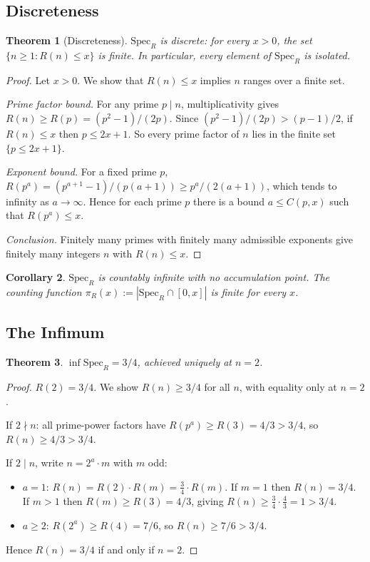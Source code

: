 \documentclass[12pt]{article}
\newtheorem{theorem}{Theorem}[section]
\newtheorem{corollary}[theorem]{Corollary}
\newcommand{\SpecR}{\mathrm{Spec}_R}
\begin{document}
\subsection{Discreteness}

\begin{theorem}[Discreteness]\label{thm:discrete}
$\SpecR$ is discrete: for every $x>0$, the set $\{n\ge1 : R(n)\le x\}$ is
finite.  In particular, every element of $\SpecR$ is isolated.
\end{theorem}

\begin{proof}
Let $x>0$.  We show that $R(n)\le x$ implies $n$ ranges over a finite set.

\medskip\noindent\textit{Prime factor bound.}
For any prime $p\mid n$, multiplicativity gives $R(n)\ge R(p)=(p^2-1)/(2p)$.
Since $(p^2-1)/(2p)>(p-1)/2$, if $R(n)\le x$ then $p\le 2x+1$.  So every
prime factor of $n$ lies in the finite set $\{p\le 2x+1\}$.

\medskip\noindent\textit{Exponent bound.}
For a fixed prime $p$, $R(p^a)=(p^{a+1}-1)/(p(a+1))\ge p^a/(2(a+1))$, which
tends to infinity as $a\to\infty$.  Hence for each prime $p$ there is a bound
$a\le C(p,x)$ such that $R(p^a)\le x$.

\medskip\noindent\textit{Conclusion.}
Finitely many primes with finitely many admissible exponents give finitely many
integers $n$ with $R(n)\le x$.
\end{proof}

\begin{corollary}
$\SpecR$ is countably infinite with no accumulation point.
The counting function $\pi_R(x):=|\SpecR\cap[0,x]|$ is finite for every $x$.
\end{corollary}

\subsection{The Infimum}

\begin{theorem}\label{thm:inf}
$\inf\SpecR = 3/4$, achieved uniquely at $n=2$.
\end{theorem}

\begin{proof}
$R(2)=3/4$.  We show $R(n)\ge 3/4$ for all $n$, with equality only at $n=2$.

If $2\nmid n$: all prime-power factors have $R(p^a)\ge R(3)=4/3>3/4$, so
$R(n)\ge4/3>3/4$.

If $2\mid n$, write $n=2^a\cdot m$ with $m$ odd:
\begin{itemize}
  \item $a=1$: $R(n)=R(2)\cdot R(m)=\tfrac{3}{4}\cdot R(m)$.
    If $m=1$ then $R(n)=3/4$.  If $m>1$ then $R(m)\ge R(3)=4/3$, giving
    $R(n)\ge \tfrac{3}{4}\cdot\tfrac{4}{3}=1>3/4$.
  \item $a\ge2$: $R(2^a)\ge R(4)=7/6$, so $R(n)\ge7/6>3/4$.
\end{itemize}
Hence $R(n)=3/4$ if and only if $n=2$.
\end{proof}
\end{document}
